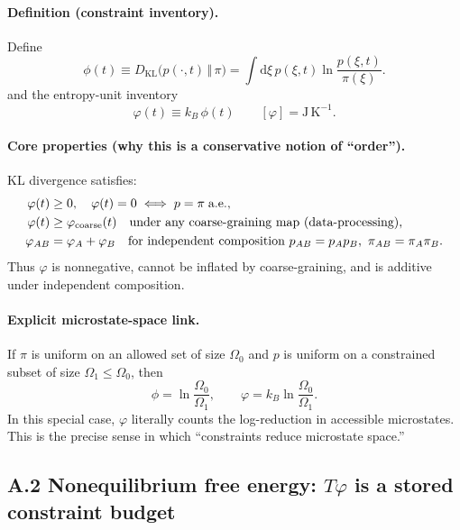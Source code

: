 \documentclass[10pt]{article}
\providecommand{\dd}{\mathrm{d}}
\begin{document}
\paragraph{Definition (constraint inventory).}
Define
\begin{equation}
\phi(t) \equiv D_{\mathrm{KL}}\!\bigl(p(\cdot,t)\,\Vert\,\pi\bigr)
=\int \dd \xi\,p(\xi,t)\ln\!\frac{p(\xi,t)}{\pi(\xi)}.
\label{eq:app_phi_def}
\end{equation}
and the entropy-unit inventory
\begin{equation}
\varphi(t)\equiv k_B\,\phi(t)
\qquad [\varphi]=\mathrm{J\,K^{-1}}.
\label{eq:app_varphi_def}
\end{equation}

\paragraph{Core properties (why this is a conservative notion of ``order'').}
KL divergence satisfies:
\begin{align}
\varphi(t) &\ge 0, \quad \varphi(t)=0 \iff p=\pi\;\text{a.e.}, \label{eq:app_phi_nonneg}\\
\varphi(t) &\ge \varphi_{\rm coarse}(t) \quad \text{under any coarse-graining map (data-processing)}, \label{eq:app_phi_dataproc}\\
\varphi_{AB} &= \varphi_A+\varphi_B \quad \text{for independent composition } p_{AB}=p_Ap_B,\ \pi_{AB}=\pi_A\pi_B. \label{eq:app_phi_add}
\end{align}
Thus $\varphi$ is nonnegative, cannot be inflated by coarse-graining, and is additive under
independent composition.

\paragraph{Explicit microstate-space link.}
If $\pi$ is uniform on an allowed set of size $\Omega_0$ and $p$ is uniform on a constrained subset
of size $\Omega_1\le\Omega_0$, then
\begin{equation}
\phi = \ln\!\frac{\Omega_0}{\Omega_1}, \qquad
\varphi = k_B \ln\!\frac{\Omega_0}{\Omega_1}.
\label{eq:app_microstates}
\end{equation}
In this special case, $\varphi$ literally counts the log-reduction in accessible microstates.
This is the precise sense in which ``constraints reduce microstate space.''

\subsection{A.2 Nonequilibrium free energy: $T\varphi$ is a stored constraint budget}
\label{app:noneq_free_energy}
\end{document}
